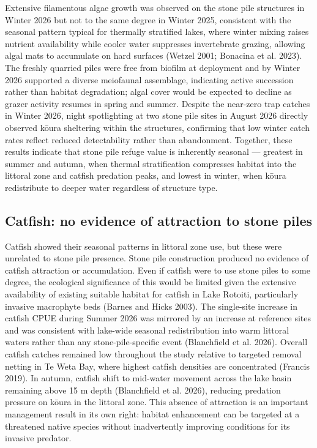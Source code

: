 \documentclass[
  12pt,
  a4paper,
  oneside]{scrbook}
\begin{document}
Extensive filamentous algae growth was observed on the stone pile
structures in Winter 2026 but not to the same degree in Winter 2025,
consistent with the seasonal pattern typical for thermally stratified
lakes, where winter mixing raises nutrient availability while cooler
water suppresses invertebrate grazing, allowing algal mats to accumulate
on hard surfaces (Wetzel 2001; Bonacina et al. 2023). The freshly
quarried piles were free from biofilm at deployment and by Winter 2026
supported a diverse meiofaunal assemblage, indicating active succession
rather than habitat degradation; algal cover would be expected to
decline as grazer activity resumes in spring and summer. Despite the
near-zero trap catches in Winter 2026, night spotlighting at two stone
pile sites in August 2026 directly observed kōura sheltering within the
structures, confirming that low winter catch rates reflect reduced
detectability rather than abandonment. Together, these results indicate
that stone pile refuge value is inherently seasonal --- greatest in
summer and autumn, when thermal stratification compresses habitat into
the littoral zone and catfish predation peaks, and lowest in winter,
when kōura redistribute to deeper water regardless of structure type.

\subsection{Catfish: no evidence of attraction to stone
piles}\label{catfish-no-evidence-of-attraction-to-stone-piles}

Catfish showed their seasonal patterns in littoral zone use, but these
were unrelated to stone pile presence. Stone pile construction produced
no evidence of catfish attraction or accumulation. Even if catfish were
to use stone piles to some degree, the ecological significance of this
would be limited given the extensive availability of existing suitable
habitat for catfish in Lake Rotoiti, particularly invasive macrophyte
beds (Barnes and Hicks 2003). The single-site increase in catfish CPUE
during Summer 2026 was mirrored by an increase at reference sites and
was consistent with lake-wide seasonal redistribution into warm littoral
waters rather than any stone-pile-specific event (Blanchfield et al.
2026). Overall catfish catches remained low throughout the study
relative to targeted removal netting in Te Weta Bay, where highest
catfish densities are concentrated (Francis 2019). In autumn, catfish
shift to mid-water movement across the lake basin remaining above 15 m
depth (Blanchfield et al. 2026), reducing predation pressure on kōura in
the littoral zone. This absence of attraction is an important management
result in its own right: habitat enhancement can be targeted at a
threatened native species without inadvertently improving conditions for
its invasive predator.
\end{document}
